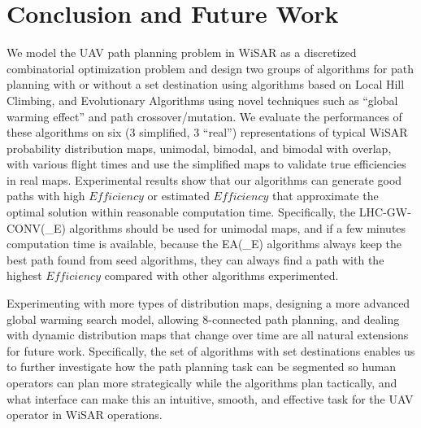 \section{Conclusion and Future Work}

We model the UAV path planning problem in WiSAR as a discretized combinatorial optimization problem and design two groups of algorithms for path planning with or without a set destination using algorithms based on Local Hill Climbing, and Evolutionary Algorithms using novel techniques such as ``global warming effect'' and path crossover/mutation. We evaluate the performances of these algorithms on six (3 simplified, 3 ``real'') representations of typical WiSAR probability distribution maps, unimodal, bimodal, and bimodal with overlap, with various flight times and use the simplified maps to validate true efficiencies in real maps. Experimental results show that our algorithms can generate good paths with high $\mathit{Efficiency}$ or estimated $\mathit{Efficiency}$ that approximate the optimal solution within reasonable computation time. Specifically, the LHC-GW-CONV(\_E) algorithms should be used for unimodal maps, and if a few minutes computation time is available, because the EA(\_E) algorithms always keep the best path found from seed algorithms, they can always find a path with the highest $\mathit{Efficiency}$ compared with other algorithms experimented.

Experimenting with more types of distribution maps, designing a more advanced global warming search model, allowing 8-connected path planning, and dealing with dynamic distribution maps that change over time are all natural extensions for future work. Specifically, the set of algorithms with set destinations enables us to further investigate how the path planning task can be segmented so human operators can plan more strategically while the algorithms plan tactically, and what interface can make this an intuitive, smooth, and effective task for the UAV operator in WiSAR operations.
